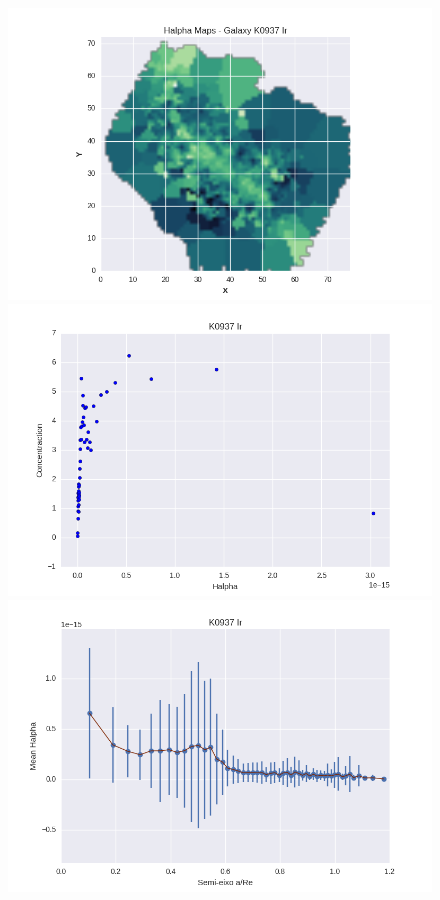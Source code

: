 \begin{figure}[!ht]
\begin{center}
\setcaptionmargin{1cm}
\includegraphics[width=0.3 \columnwidth,angle=0]{fig/galK0937.png}
\includegraphics[width=0.3 \columnwidth,angle=0]{fig/gal_K0937_concentration_Halpha.png}
\includegraphics[width=0.3 \columnwidth,angle=0]{fig/gal_K0937_perfis_elip.png}
\end{center}
\end{figure}
